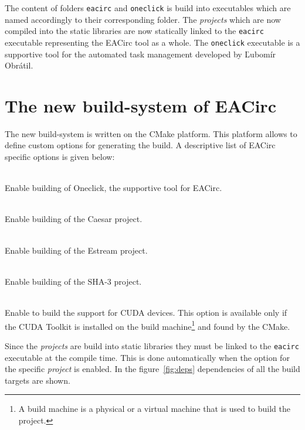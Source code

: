 \documentclass[12pt,oneside]{fithesis2}
\begin{document}
The content of folders \texttt{eacirc} and \texttt{oneclick} is build into executables which are named accordingly to their corresponding folder. The \emph{projects} which are now compiled into the static libraries are now statically linked to the \texttt{eacirc} executable representing the EACirc tool as a whole. The \texttt{oneclick} executable is a supportive tool for the automated task management developed by Ľubomír Obrátil.~\cite{oneclick}

\section{The new build-system of EACirc}

The new build-system is written on the CMake platform. This platform allows to define custom options for generating the build. A descriptive list of EACirc specific options is given below:

\begin{description}[noitemsep]
	\item[\texttt{BUILD\_ONECLICK}] \hfill \\
	Enable building of Oneclick, the supportive tool for EACirc.
	\item[\texttt{BUILD\_CAESAR}] \hfill \\
	Enable building of the Caesar project.
	\item[\texttt{BUILD\_ESTREAM}] \hfill \\
	Enable building of the Estream project.
	\item[\texttt{BUILD\_SHA3}] \hfill \\
	Enable building of the SHA-3 project.
	\item[\texttt{BUILD\_CUDA}] \hfill \\
	Enable to build the support for CUDA devices. This option is available only if the CUDA Toolkit \cite{cuda_toolkit} is installed on the build machine\footnote{A build machine is a physical or a virtual machine that is used to build the project.} and found by the CMake.
\end{description}

\noindent
Since the \emph{projects} are build into static libraries they must be linked to the \texttt{eacirc} executable at the compile time. This is done automatically when the option for the specific \emph{project} is enabled. In the figure~\ref{fig:deps} dependencies of all the build targets are shown.
\end{document}
